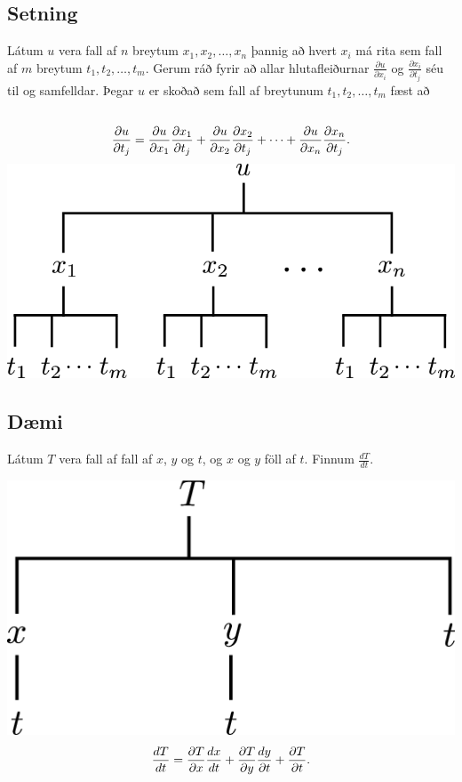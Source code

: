 \documentclass[a4paper,10pt,icelandic]{sphinxmanual}
\begin{document}
\subsection{Setning}
\label{Kafli2:id20}
Látum \(u\) vera fall af \(n\) breytum
\(x_1, x_2, \ldots, x_n\) þannig að hvert \(x_i\) má rita sem
fall af \(m\) breytum \(t_1, t_2, \ldots, t_m\). Gerum ráð fyrir
að allar hlutafleiðurnar \(\frac{\partial u}{\partial x_i}\) og
\(\frac{\partial x_i}{\partial t_j}\) séu til og samfelldar. Þegar
\(u\) er skoðað sem fall af breytunum \(t_1, t_2, \ldots, t_m\)
fæst að
\begin{gather}
\begin{split}\displaystyle\end{split}\notag\\\begin{split}\frac{\partial u}{\partial t_j}=
\frac{\partial u}{\partial x_1}\frac{\partial x_1}{\partial t_j}
+\frac{\partial u}{\partial x_2}\frac{\partial x_2}{\partial t_j}
+\cdots+
\frac{\partial u}{\partial x_n}\frac{\partial x_n}{\partial t_j}.\end{split}\notag
\end{gather}
{\hfill\includegraphics[width=0.500\linewidth]{chain3.png}\hfill}


\subsection{Dæmi}
\label{Kafli2:id21}
Látum \(T\) vera fall af fall af \(x\), \(y\) og \(t\),
og \(x\) og \(y\) föll af \(t\). Finnum
\(\frac{ dT}{dt}\).

{\hfill\includegraphics[width=0.400\linewidth]{chain5.png}\hfill}
\begin{gather}
\begin{split}\displaystyle \frac{d T}{d t} = \frac{\partial T}{\partial x} \frac{d x}{d t} +\frac{\partial T}{\partial y} \frac{d y}{\partial t} + \frac{\partial T}{\partial t} .\end{split}\notag
\end{gather}
\end{document}
